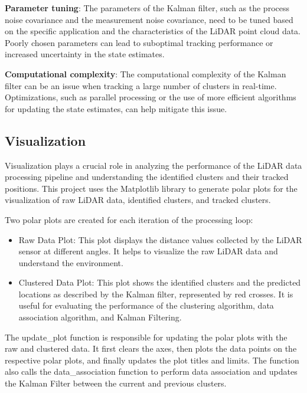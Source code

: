 \documentclass[journal]{IEEEtran} %
\begin{document}
\textbf{Parameter tuning}: The parameters of the Kalman filter, such as the process noise covariance and the measurement noise covariance, need to be tuned based on the specific application and the characteristics of the LiDAR point cloud data. Poorly chosen parameters can lead to suboptimal tracking performance or increased uncertainty in the state estimates.

\textbf{Computational complexity}: The computational complexity of the Kalman filter can be an issue when tracking a large number of clusters in real-time. Optimizations, such as parallel processing or the use of more efficient algorithms for updating the state estimates, can help mitigate this issue.



\subsection{Visualization}

Visualization plays a crucial role in analyzing the performance of the LiDAR data processing pipeline and understanding the identified clusters and their tracked positions. This project uses the Matplotlib library to generate polar plots for the visualization of raw LiDAR data, identified clusters, and tracked clusters.

Two polar plots are created for each iteration of the processing loop:
\begin{itemize}

\item Raw Data Plot: This plot displays the distance values collected by the LiDAR sensor at different angles. It helps to visualize the raw LiDAR data and understand the environment.

\item Clustered Data Plot: This plot shows the identified clusters and the predicted locations as described by the Kalman filter, represented by red crosses. It is useful for evaluating the performance of the clustering algorithm, data association algorithm, and Kalman Filtering.

\end{itemize}

The update\_plot function is responsible for updating the polar plots with the raw and clustered data. It first clears the axes, then plots the data points on the respective polar plots, and finally updates the plot titles and limits. The function also calls the data\_association function to perform data association and updates the Kalman Filter between the current and previous clusters.
\end{document}
